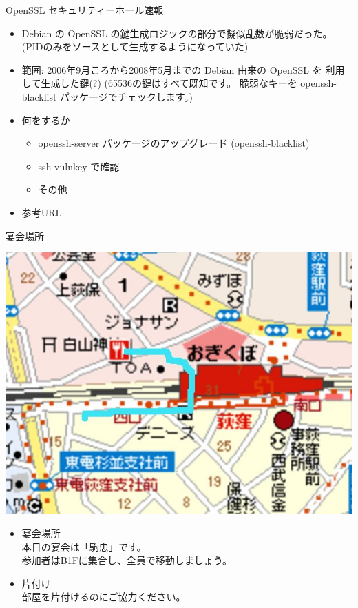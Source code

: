 \documentclass[cjk,dvipdfmx,12pt]{beamer}
\begin{document}


\begin{frame}{OpenSSL セキュリティーホール速報}
 \begin{itemize}
  \item Debian の OpenSSL の鍵生成ロジックの部分で擬似乱数が脆弱だった。
	(PIDのみをソースとして生成するようになっていた)
  \item 範囲: 2006年9月ころから2008年5月までの Debian 由来の OpenSSL を
	利用して生成した鍵(?)
	(65536の鍵はすべて既知です。
	脆弱なキーを openssh-blacklist パッケージでチェックします。)
  \item 何をするか
	\begin{itemize}
	 \item openssh-server パッケージのアップグレード
	       (openssh-blacklist)
	 \item ssh-vulnkey で確認
	 \item その他
	\end{itemize}
  \item 参考URL
 \end{itemize}
\end{frame}


\begin{frame}{宴会場所}
\begin{center}
 \includegraphics[width=0.5\hsize]{image200804/enkaimap.jpg}
\end{center}

\begin{itemize}
 \item 宴会場所\\
       本日の宴会は「駒忠」です。\\
       参加者はB1Fに集合し、全員で移動しましょう。
 \item 片付け\\
       部屋を片付けるのにご協力ください。
\end{itemize}

\end{frame}
\end{document}
